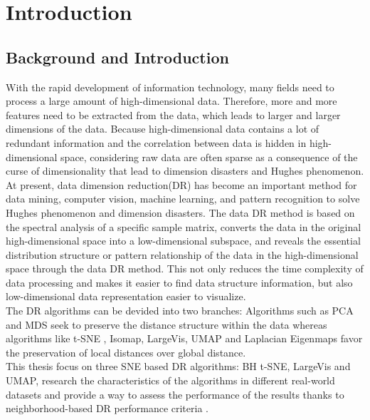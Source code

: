 \part{Introduction} \label{part:how is the conclusion}

\chapter{Background and Introduction}


With the rapid development of information technology, many fields need to process a large amount of high-dimensional data. Therefore, more and more features need to be extracted from the data, which leads to larger and larger dimensions of the data. Because high-dimensional data contains a lot of redundant information and the correlation between data is hidden in high-dimensional space, considering raw data are often sparse as a consequence of the curse of dimensionality that lead to dimension disasters and Hughes phenomenon.\\

\noindent At present, data dimension reduction(DR) has become an important method for data mining, computer vision, machine learning, and pattern recognition to solve Hughes phenomenon and dimension disasters. The data DR method is based on the spectral analysis of a specific sample matrix, converts the data in the original high-dimensional space into a low-dimensional subspace, and reveals the essential distribution structure or pattern relationship of the data in the high-dimensional space through the data DR method. This not only reduces the time complexity of data processing and makes it easier to find data structure information, but also low-dimensional data representation easier to visualize.\\


\noindent The DR algorithms can be devided into two branches: Algorithms such as PCA and MDS seek to preserve the distance structure within the data whereas algorithms like t-SNE , Isomap, LargeVis, UMAP and Laplacian Eigenmaps favor the preservation of local distances over global distance.\\

\noindent This thesis focus on three SNE based DR algorithms: BH t-SNE, LargeVis and UMAP, research the characteristics of the algorithms in different real-world datasets and provide a way to assess the performance of the results thanks to neighborhood-based DR performance criteria \cite{ref4}.



